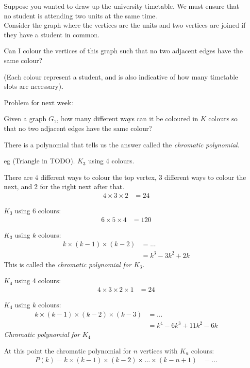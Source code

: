 Suppose you wanted to draw up the university timetable. We must ensure that no
student is attending two units at the same time.\\
Consider the graph where the vertices are the units and two vertices are joined
if they have a student in common.

Can I colour the vertices of this graph such that no two adjacent edges have
the same colour?

(Each colour represent a student, and is also indicative of how many
timetable slots are necessary).


Problem for next week:

Given a graph $G_1$, how many different ways can it be coloured in $K$ colours
so that no two adjacent edges have the same colour?

There is a polynomial that tells us the answer called the \emph{chromatic
polynomial}.

eg (Triangle in TODO). 
$K_3$ using 4 colours.

There are 4 different ways to colour the top vertex, 3 different ways to
colour the next, and 2 for the right next after that.
\begin{align}
  4 \times 3 \times 2 & = 24
\end{align}

$K_3$ using 6 colours: 
\begin{align}
  6 \times 5 \times 4 & = 120
\end{align}

$K_3$ using $k$ colours:
\begin{align}
  k \times (k-1) \times (k-2) & = \ldots \\
  & = k^{3} - 3k^{2} + 2k
\end{align}
This is called the \emph{chromatic polynomial for $K_3$}.

$K_4$ using 4 colours:
\begin{align}
  4 \times 3 \times 2 \times 1 & = 24
\end{align}

$K_4$ using $k$ colours:
\begin{align}
  k \times (k-1) \times (k-2) \times (k-3) & = \ldots \\
  & = k^{4} - 6k^{3} + 11k^{2} - 6k
\end{align}
\emph{Chromatic polynomial for $K_4$}

At this point the chromatic polynomial for $n$ vertices with $K_n$ colours:
\begin{align}
  P(k) = k \times (k-1) \times (k-2) \times \ldots \times (k-n+1) & = \ldots
\end{align}

